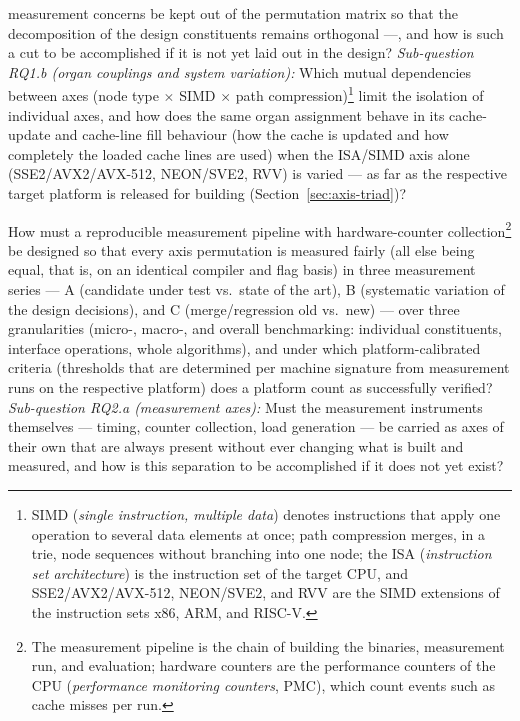 \begin{description}
  measurement concerns be kept out of the permutation matrix so that the decomposition of the
  design constituents remains orthogonal ---, and how is such a cut to be accomplished
  if it is not yet laid out in the design? \emph{Sub-question RQ1.b (organ couplings and
  system variation):} Which mutual dependencies between axes (node type $\times$ SIMD
  $\times$ path compression)\footnote{SIMD (\emph{single instruction, multiple data}) denotes
  instructions that apply one operation to several data elements at once; path compression merges,
  in a trie, node sequences without branching into one node; the ISA (\emph{instruction
  set architecture}) is the instruction set of the target CPU, and SSE2/AVX2/AVX-512, NEON/SVE2, and RVV are
  the SIMD extensions of the instruction sets x86, ARM, and RISC-V\@.}
  limit the isolation of individual axes, and how does the same organ assignment behave
  in its cache-update and cache-line fill behaviour (how the cache is updated and how completely
  the loaded cache lines are used) when the ISA/SIMD axis alone (SSE2/AVX2/AVX-512,
  NEON/SVE2, RVV) is varied --- as far as the respective target platform is released for building
  (Section~\ref{sec:axis-triad})?
  \item[RQ2 (Measurement methodology)] How must a reproducible measurement pipeline with
  hardware-counter collection\footnote{The measurement pipeline is the chain of building the binaries, measurement run,
  and evaluation; hardware counters are the performance counters of the CPU (\emph{performance monitoring
  counters}, PMC), which count events such as cache misses per run.} be designed so that every
  axis permutation is measured fairly (all else being equal,
  that is, on an identical compiler and flag basis) in three measurement series ---
  A (candidate under test vs.\ state of the
  art), B (systematic variation of the design decisions), and C (merge/regression
  old vs.\ new) --- over three granularities (micro-, macro-, and overall benchmarking: individual
  constituents, interface operations, whole algorithms), and under which
  platform-calibrated criteria (thresholds that are determined per machine signature from measurement runs on the
  respective platform) does a platform count as successfully verified?
  \emph{Sub-question RQ2.a (measurement axes):} Must the measurement instruments themselves --- timing,
  counter collection, load generation --- be carried as axes of their own that are always present
  without ever changing what is built and measured, and how is this separation to be
  accomplished if it does not yet exist?

\end{description}
